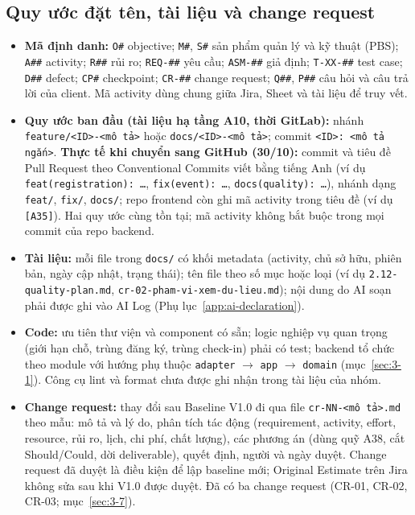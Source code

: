 \subsection*{Quy ước đặt tên, tài liệu và change request}
\begin{itemize}
  \item \textbf{Mã định danh:} \texttt{O\#} objective; \texttt{M\#}, \texttt{S\#} sản phẩm quản lý và kỹ thuật (PBS); \texttt{A\#\#} activity; \texttt{R\#\#} rủi ro; \texttt{REQ-\#\#} yêu cầu; \texttt{ASM-\#\#} giả định; \texttt{T-XX-\#\#} test case; \texttt{D\#\#} defect; \texttt{CP\#} checkpoint; \texttt{CR-\#\#} change request; \texttt{Q\#\#}, \texttt{P\#\#} câu hỏi và câu trả lời của client. Mã activity dùng chung giữa Jira, Sheet và tài liệu để truy vết.
  \item \textbf{Quy ước ban đầu (tài liệu hạ tầng A10, thời GitLab):} nhánh \texttt{feature/<ID>-<mô tả>} hoặc \texttt{docs/<ID>-<mô tả>}; commit \texttt{<ID>: <mô tả ngắn>}. \textbf{Thực tế khi chuyển sang GitHub (30/10):} commit và tiêu đề Pull Request theo Conventional Commits viết bằng tiếng Anh (ví dụ \texttt{feat(registration): \ldots}, \texttt{fix(event): \ldots}, \texttt{docs(quality): \ldots}), nhánh dạng \texttt{feat/}, \texttt{fix/}, \texttt{docs/}; repo frontend còn ghi mã activity trong tiêu đề (ví dụ \texttt{[A35]}). Hai quy ước cùng tồn tại; mã activity không bắt buộc trong mọi commit của repo backend.
  \item \textbf{Tài liệu:} mỗi file trong \texttt{docs/} có khối metadata (activity, chủ sở hữu, phiên bản, ngày cập nhật, trạng thái); tên file theo số mục hoặc loại (ví dụ \texttt{2.12-quality-plan.md}, \texttt{cr-02-pham-vi-xem-du-lieu.md}); nội dung do AI soạn phải được ghi vào AI Log (Phụ lục~\ref{app:ai-declaration}).
  \item \textbf{Code:} ưu tiên thư viện và component có sẵn; logic nghiệp vụ quan trọng (giới hạn chỗ, trùng đăng ký, trùng check-in) phải có test; backend tổ chức theo module với hướng phụ thuộc \texttt{adapter} $\rightarrow$ \texttt{app} $\rightarrow$ \texttt{domain} (mục~\ref{sec:3-1}). Công cụ lint và format chưa được ghi nhận trong tài liệu của nhóm.
  \item \textbf{Change request:} thay đổi sau Baseline V1.0 đi qua file \texttt{cr-NN-<mô tả>.md} theo mẫu: mô tả và lý do, phân tích tác động (requirement, activity, effort, resource, rủi ro, lịch, chi phí, chất lượng), các phương án (dùng quỹ A38, cắt Should/Could, dời deliverable), quyết định, người và ngày duyệt. Change request đã duyệt là điều kiện để lập baseline mới; Original Estimate trên Jira không sửa sau khi V1.0 được duyệt. Đã có ba change request (CR-01, CR-02, CR-03; mục~\ref{sec:3-7}).
\end{itemize}

